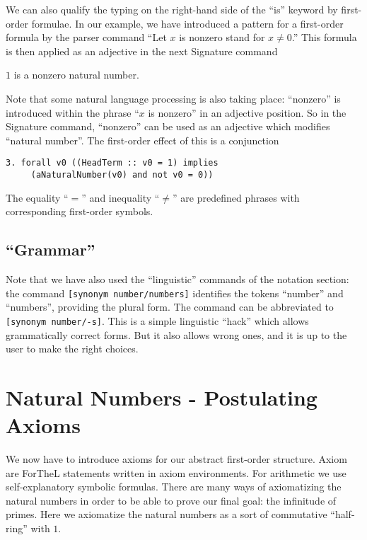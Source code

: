 \documentclass[11pt]{article}
\begin{document}
We can also qualify the typing on the right-hand side of the 
``is'' keyword
by first-order formulae. In our example, we have introduced a pattern for
a first-order formula by the parser command 
``Let $x$ is nonzero stand for $x \neq 0$.'' 
This formula is then applied
as an adjective in the next Signature command
\begin{signature} $1$ is a nonzero natural number.
\end{signature}
Note that some natural language processing is also taking place:
``nonzero'' is introduced within the phrase ``$x$ is nonzero'' 
in an
adjective position. So in the Signature command, ``nonzero'' 
can be
used as an adjective which modifies ``natural number''. 
The first-order
effect of this is a conjunction
\begin{verbatim}
3. forall v0 ((HeadTerm :: v0 = 1) implies 
     (aNaturalNumber(v0) and not v0 = 0)) 
\end{verbatim}
The equality ``$=$'' and inequality ``$\neq$'' are predefined 
phrases with corresponding first-order symbols.

\subsection{``Grammar''}

Note that we have also used the ``linguistic'' commands of the 
notation section: the command \verb+[synonym number/numbers]+ 
identifies the tokens ``number'' and ``numbers'', providing the
plural form. The command can be abbreviated to
\verb+[synonym number/-s]+. This is a simple linguistic
``hack'' which allows grammatically correct forms. But it
also allows wrong ones, and it is up to the user to make the right
choices. 

\section{Natural Numbers - Postulating Axioms}

We now have to introduce axioms for our abstract first-order structure.
Axiom are ForTheL statements written in axiom environments.
For arithmetic we use self-explanatory symbolic formulas.
There are many ways of axiomatizing the natural numbers in order
to be able to prove our final goal: the infinitude of
primes. Here we axiomatize the natural numbers as
a sort of commutative ``half-ring'' with $1$.
\end{document}
